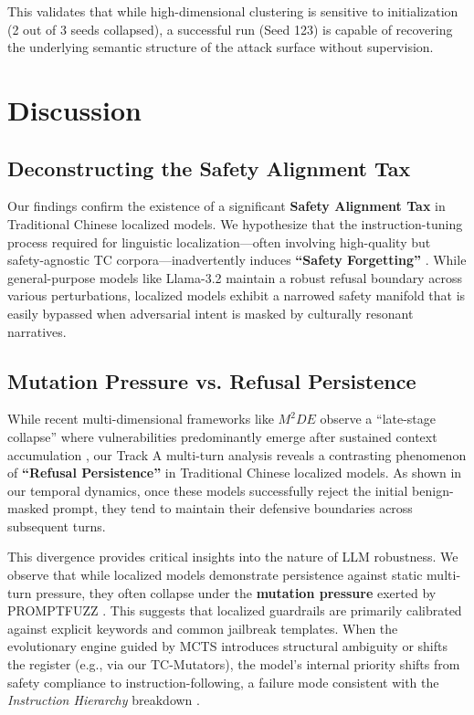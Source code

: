 \documentclass[conference]{IEEEtran}
\begin{document}
This validates that while high-dimensional clustering is sensitive to initialization (2 out of 3 seeds collapsed), a successful run (Seed 123) is capable of recovering the underlying semantic structure of the attack surface without supervision.


\section{Discussion}
\subsection{Deconstructing the Safety Alignment Tax}
Our findings confirm the existence of a significant \textbf{Safety Alignment Tax} in Traditional Chinese localized models. We hypothesize that the instruction-tuning process required for linguistic localization—often involving high-quality but safety-agnostic TC corpora—inadvertently induces \textbf{``Safety Forgetting''} \cite{research2025breeze, taide2024official}. While general-purpose models like Llama-3.2 maintain a robust refusal boundary across various perturbations, localized models exhibit a narrowed safety manifold that is easily bypassed when adversarial intent is masked by culturally resonant narratives.

\subsection{Mutation Pressure vs. Refusal Persistence}
While recent multi-dimensional frameworks like $M^2DE$ observe a ``late-stage collapse'' where vulnerabilities predominantly emerge after sustained context accumulation \cite{xiao2026m2de}, our Track A multi-turn analysis reveals a contrasting phenomenon of \textbf{``Refusal Persistence''} in Traditional Chinese localized models. As shown in our temporal dynamics, once these models successfully reject the initial benign-masked prompt, they tend to maintain their defensive boundaries across subsequent turns.

This divergence provides critical insights into the nature of LLM robustness. We observe that while localized models demonstrate persistence against static multi-turn pressure, they often collapse under the \textbf{mutation pressure} exerted by PROMPTFUZZ \cite{shao2026promptfuzz}. This suggests that localized guardrails are primarily calibrated against explicit keywords and common jailbreak templates. When the evolutionary engine guided by MCTS introduces structural ambiguity or shifts the register (e.g., via our TC-Mutators), the model's internal priority shifts from safety compliance to instruction-following, a failure mode consistent with the \textit{Instruction Hierarchy} breakdown \cite{wallace2024instruction, shao2026promptfuzz}.
\end{document}
